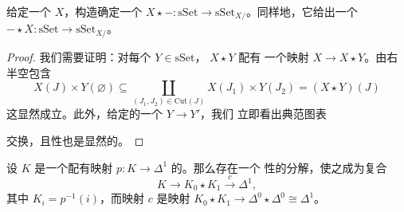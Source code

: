 \begin{lemma}\label{lem:join-functor}
给定一个\trSimplicialSet{} $X$，\trJoin{}构造确定一个\trFunctor{}%
$X \star -\colon \mathrm{sSet} \to \mathrm{sSet}_{X/}$。同样地，它给出一个%
\trFunctor{} $- \star X\colon \mathrm{sSet} \to \mathrm{sSet}_{X/}$。
\end{lemma}

\begin{proof}
我们需要证明：对每个 $Y \in \mathrm{sSet}$，\trSimplicialSet{} $X \star Y$ 配有
一个映射 $X \to X \star Y$。由右半空\trCut{}包含
\[
X(J) \times Y(\varnothing) \subseteq
\coprod_{(J_1, J_2) \in \mathrm{Cut}(J)} X(J_1) \times Y(J_2)
= (X \star Y)(J)
\]
这显然成立。此外，给定\trSimplicialSets{}的一个\trMorphism{} $Y \to Y'$，我们
立即看出典范图表
\begin{center}
\end{center}
交换，且\trFunctor{}性也是显然的。
\end{proof}

\begin{lemma}\label{lem:factorization-over-delta-1}
设 $K$ 是一个配有映射 $p\colon K \to \Delta^1$ 的\trSimplicialSet{}。那么存在一个%
\trFunctor{}性的分解，使之成为复合
\[
K \to K_0 \star K_1 \xrightarrow{\ c\ } \Delta^1,
\]
其中 $K_i = p^{-1}(i)$，而映射 $c$ 是映射
$K_0 \star K_1 \to \Delta^0 \star \Delta^0 \cong \Delta^1$。
\end{lemma}

